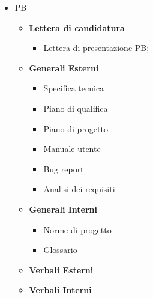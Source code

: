         \begin{itemize}
                \item PB
                \begin{itemize}
                        \item \textbf{Lettera di candidatura}
                        \begin{itemize}
                                \item Lettera di presentazione PB;
                        \end{itemize}
                        \item \textbf{Generali Esterni}
                        \begin{itemize}
                                \item Specifica tecnica
                                \item Piano di qualifica
                                \item Piano di progetto
                                \item Manuale utente
                                \item Bug report
                                \item Analisi dei requisiti
                        \end{itemize}
                        \item \textbf{Generali Interni}
                        \begin{itemize}
                                \item Norme di progetto
                                \item Glossario
                        \end{itemize}
                        \item \textbf{Verbali Esterni}
                        \item \textbf{Verbali Interni}
                \end{itemize}


\end{itemize}
